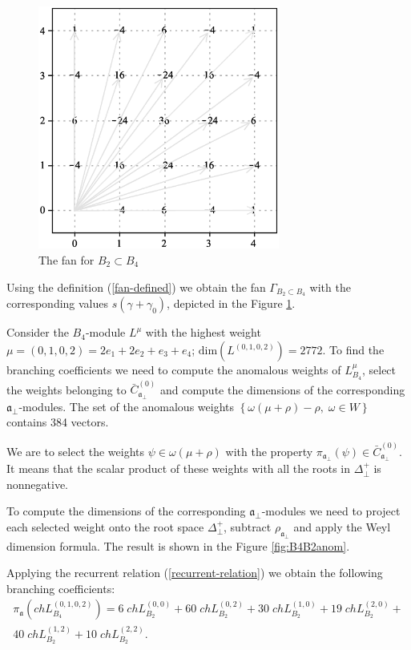 \documentclass[12pt]{iopart}
\theoremstyle{definition}
\theoremstyle{definition}
\theoremstyle{definition}
\theoremstyle{definition}
\begin{document}
\begin{figure}[b]
  \centering
  \includegraphics[height=80mm]{figure5.eps}
  \caption{The fan for $B_2\subset B_4$}
  \label{fig:B4B2Fan}
\end{figure}
Using the definition (\ref{fan-defined}) we obtain the fan
$\Gamma_{B_2\subset B_4}$ with the corresponding values $s(\gamma+\gamma_0)$,
depicted in the Figure \ref{fig:B4B2Fan}.


Consider the $B_4$-module $L^{\mu}$ with the highest weight $\mu=(0,1,0,2)=2
e_1 + 2 e_2 + e_3 + e_4$; $\mathrm{dim}(L^{(0,1,0,2)})=2772$.
To find the branching coefficients we need to compute the anomalous weights of
$L^{\mu}_{B_4}$, select the weights belonging to $\bar{C}^{\left( 0 \right)}_{\mathfrak{a}_{\bot}}$
and compute the dimensions of the corresponding $\mathfrak{a}_{\bot}$-modules.
The set of the anomalous weights $\left\{ \omega(\mu+\rho)-\rho,\; \omega\in W\right\}$
contains 384 vectors.

We are to select the weights $\psi \in \omega(\mu+\rho)$  with the property
$\pi_{\mathfrak{a}_{\bot}} \left(  \psi \right) \in \bar{C}^{\left( 0 \right)}_{\mathfrak{a}_{\bot}}$.
It means that the scalar product of these weights with all the roots in $\Delta^{+}_{\bot}$ is nonnegative.

To compute the dimensions of the corresponding
$\mathfrak{a}_{\bot}$-modules we need to project each selected weight
onto the root space $\Delta^{+}_{\bot}$, subtract
$\rho_{\mathfrak{a}_{\bot}}$ and apply the Weyl dimension formula. The result is shown in the Figure \ref{fig:B4B2anom}.

Applying the recurrent relation (\ref{recurrent-relation}) we obtain the
following branching coefficients:
\begin{eqnarray*}
  \label{eq:24}
  \pi_{\mathfrak{a}} \left(ch L^{(0,1,0,2)}_{B_4}\right) = 6 \; ch L^{(0,0)}_{B_2}+ 60
  \; ch L_{B_2}^{(0,2)}+ 30 \; ch L_{B_2}^{(1,0)}+ 19 \; ch L_{B_2}^{(2,0)}+\\
  40 \; ch L_{B_2}^{(1,2)}+ 10 \; ch L_{B_2}^{(2,2)}.
\end{eqnarray*}
\end{document}
